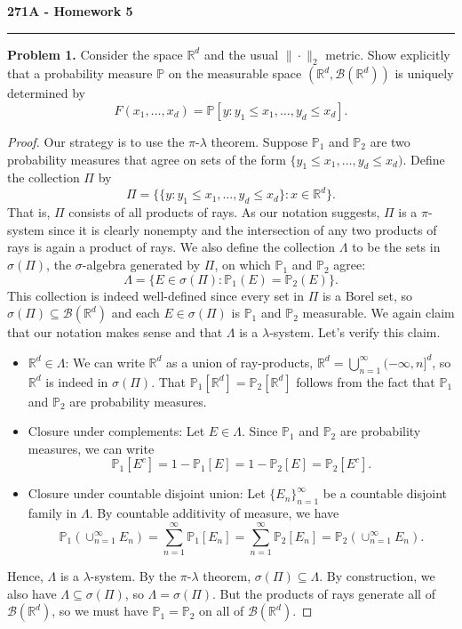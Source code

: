 \documentclass[11pt,letterpaper]{report}
\newcommand{\reals}{\mathbb{R}}
\newcommand{\mcal}[1]{\mathcal{#1}}
\newcommand{\Prob}{\mathbb{P}}
\begin{document}
\begin{center}
{\bf \Large 271A - Homework 5}
\vspace{0.2cm}
\hrule
\end{center}

\noindent\textbf{Problem 1. }
Consider the space $\reals^d$ and the usual $\|\cdot \|_2$ metric. Show explicitly that a probability measure $\Prob$ on the measurable space $(\reals^d, \mcal{B}(\reals^d))$ is uniquely determined by
\[
F(x_1, \ldots, x_d) = \Prob[y: y_1\leq x_1, \ldots, y_d\leq x_d].
\]
\begin{proof}
	Our strategy is to use the $\pi$-$\lambda$ theorem. Suppose $\Prob_1$ and $\Prob_2$ are two probability measures that agree on sets of the form $\{y_1 \leq x_1, \ldots, y_d\leq x_d)$. Define the collection $\Pi$ by
	\[
	\Pi = \big\{ \{y: y_1\leq x_1, \ldots, y_d\leq x_d\}: x\in \reals^d\big\}.
	\]
	That is, $\Pi$ consists of all products of rays. As our notation suggests, $\Pi$ is a $\pi$-system since it is clearly nonempty and the intersection of any two products of rays is again a product of rays. We also define the collection $\Lambda$ to be the sets in $\sigma(\Pi)$, the $\sigma$-algebra generated by $\Pi$, on which $\Prob_1$ and $\Prob_2$ agree:
	\[
	\Lambda = \{E \in \sigma(\Pi): \Prob_1(E) = \Prob_2(E)\}.
	\]
	This collection is indeed well-defined since every set in $\Pi$ is a Borel set, so $\sigma(\Pi)\subseteq \mcal{B}(\reals^d)$ and each $E\in \sigma(\Pi)$ is $\Prob_1$ and $\Prob_2$ measurable. We again claim that our notation makes sense and that $\Lambda$ is a $\lambda$-system. Let's verify this claim.
	\begin{itemize}
		\item $\reals^d\in \Lambda$: We can write $\reals^d$ as a union of ray-products, $\reals^d = \bigcup_{n=1}^\infty (-\infty, n]^d$, so $\reals^d$ is indeed in $\sigma(\Pi)$. That $\Prob_1[\reals^d] = \Prob_2[\reals^d]$ follows from the fact that $\Prob_1$ and $\Prob_2$ are probability measures.

		\item Closure under complements: Let $E\in \Lambda$. Since $\Prob_1$ and $\Prob_2$ are probability measures, we can write
		\[
		\Prob_1[E^c] = 1 - \Prob_1[E] = 1-\Prob_2[E] = \Prob_2[E^c].
		\]

		\item Closure under countable disjoint union: Let $\{E_n\}_{n=1}^\infty$ be a countable disjoint family in $\Lambda$. By countable additivity of measure, we have
		\[
		\Prob_1(\cup_{n=1}^\infty E_n) = \sum_{n=1}^\infty \Prob_1[E_n] = \sum_{n=1}^\infty \Prob_2[E_n] = \Prob_2(\cup_{n=1}^\infty E_n).
		\]
	\end{itemize}
	Hence, $\Lambda$ is a $\lambda$-system. By the $\pi$-$\lambda$ theorem, $\sigma(\Pi)\subseteq \Lambda$. By construction, we also have $\Lambda\subseteq \sigma(\Pi)$, so $\Lambda = \sigma(\Pi)$. But the products of rays generate all of $\mcal{B}(\reals^d)$, so we must have $\Prob_1 = \Prob_2$ on all of $\mcal{B}(\reals^d)$.
\end{proof}
\end{document}
